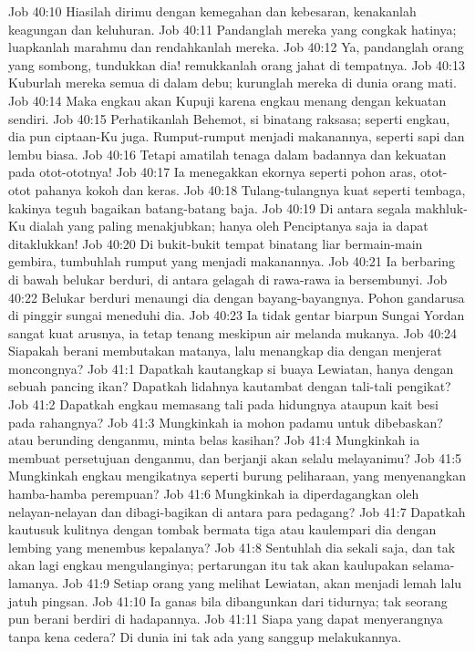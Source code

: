 Job 40:10  Hiasilah dirimu dengan kemegahan dan kebesaran, kenakanlah keagungan dan keluhuran.
Job 40:11  Pandanglah mereka yang congkak hatinya; luapkanlah marahmu dan rendahkanlah mereka.
Job 40:12  Ya, pandanglah orang yang sombong, tundukkan dia! remukkanlah orang jahat di tempatnya.
Job 40:13  Kuburlah mereka semua di dalam debu; kurunglah mereka di dunia orang mati.
Job 40:14  Maka engkau akan Kupuji karena engkau menang dengan kekuatan sendiri.
Job 40:15  Perhatikanlah Behemot, si binatang raksasa; seperti engkau, dia pun ciptaan-Ku juga. Rumput-rumput menjadi makanannya, seperti sapi dan lembu biasa.
Job 40:16  Tetapi amatilah tenaga dalam badannya dan kekuatan pada otot-ototnya!
Job 40:17  Ia menegakkan ekornya seperti pohon aras, otot-otot pahanya kokoh dan keras.
Job 40:18  Tulang-tulangnya kuat seperti tembaga, kakinya teguh bagaikan batang-batang baja.
Job 40:19  Di antara segala makhluk-Ku dialah yang paling menakjubkan; hanya oleh Penciptanya saja ia dapat ditaklukkan!
Job 40:20  Di bukit-bukit tempat binatang liar bermain-main gembira, tumbuhlah rumput yang menjadi makanannya.
Job 40:21  Ia berbaring di bawah belukar berduri, di antara gelagah di rawa-rawa ia bersembunyi.
Job 40:22  Belukar berduri menaungi dia dengan bayang-bayangnya. Pohon gandarusa di pinggir sungai meneduhi dia.
Job 40:23  Ia tidak gentar biarpun Sungai Yordan sangat kuat arusnya, ia tetap tenang meskipun air melanda mukanya.
Job 40:24  Siapakah berani membutakan matanya, lalu menangkap dia dengan menjerat moncongnya?
Job 41:1  Dapatkah kautangkap si buaya Lewiatan, hanya dengan sebuah pancing ikan? Dapatkah lidahnya kautambat dengan tali-tali pengikat?
Job 41:2  Dapatkah engkau memasang tali pada hidungnya ataupun kait besi pada rahangnya?
Job 41:3  Mungkinkah ia mohon padamu untuk dibebaskan? atau berunding denganmu, minta belas kasihan?
Job 41:4  Mungkinkah ia membuat persetujuan denganmu, dan berjanji akan selalu melayanimu?
Job 41:5  Mungkinkah engkau mengikatnya seperti burung peliharaan, yang menyenangkan hamba-hamba perempuan?
Job 41:6  Mungkinkah ia diperdagangkan oleh nelayan-nelayan dan dibagi-bagikan di antara para pedagang?
Job 41:7  Dapatkah kautusuk kulitnya dengan tombak bermata tiga atau kaulempari dia dengan lembing yang menembus kepalanya?
Job 41:8  Sentuhlah dia sekali saja, dan tak akan lagi engkau mengulanginya; pertarungan itu tak akan kaulupakan selama-lamanya.
Job 41:9  Setiap orang yang melihat Lewiatan, akan menjadi lemah lalu jatuh pingsan.
Job 41:10  Ia ganas bila dibangunkan dari tidurnya; tak seorang pun berani berdiri di hadapannya.
Job 41:11  Siapa yang dapat menyerangnya tanpa kena cedera? Di dunia ini tak ada yang sanggup melakukannya.
